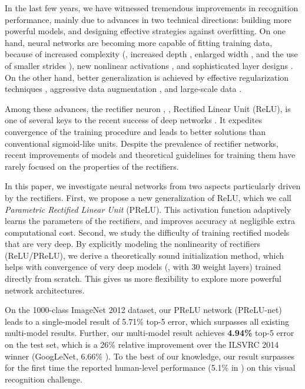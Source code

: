 \documentclass[10pt,twocolumn,letterpaper]{article}
\begin{document}
In the last few years, we have witnessed tremendous improvements in recognition performance, mainly due to advances in two technical directions: building more powerful models, and designing effective strategies against overfitting. On one hand, neural networks are becoming more capable of fitting training data, because of increased complexity (\eg, increased depth \cite{Simonyan2014,Szegedy2014}, enlarged width \cite{Zeiler2014,Sermanet2014}, and the use of smaller strides \cite{Zeiler2014,Sermanet2014,Chatfield2014,Simonyan2014}), new nonlinear activations \cite{Nair2010,Maas2013,Zeiler2013,Lin2013,Srivastava2013,Goodfellow2013}, and sophisticated layer designs \cite{Szegedy2014,He2014}. On the other hand, better generalization is achieved by effective regularization techniques \cite{Hinton2012,Srivastava2014,Goodfellow2013,Wan2013}, aggressive data augmentation \cite{Krizhevsky2012,Howard2013,Simonyan2014,Szegedy2014}, and large-scale data \cite{Deng2009,Russakovsky2014}.

Among these advances, the rectifier neuron \cite{Nair2010,Glorot2011,Maas2013,Zeiler2013}, \eg, Rectified Linear Unit (ReLU), is one of several keys to the recent success of deep networks \cite{Krizhevsky2012}. It expedites convergence of the training procedure \cite{Krizhevsky2012} and leads to better solutions \cite{Nair2010,Glorot2011,Maas2013,Zeiler2013} than conventional sigmoid-like units. Despite the prevalence of rectifier networks, recent improvements of models \cite{Zeiler2014,Sermanet2014,He2014,Simonyan2014,Szegedy2014} and theoretical guidelines for training them \cite{Glorot2010,Saxe2013} have rarely focused on the properties of the rectifiers.

In this paper, we investigate neural networks from two aspects particularly driven by the rectifiers.
First, we propose a new generalization of ReLU, which we call \emph{Parametric Rectified Linear Unit} (PReLU). This activation function adaptively learns the parameters of the rectifiers, and improves accuracy at negligible extra computational cost. Second, we study the difficulty of training rectified models that are very deep. By explicitly modeling the nonlinearity of rectifiers (ReLU/PReLU), we derive a theoretically sound initialization method, which helps with convergence of very deep models (\eg, with 30 weight layers) trained directly from scratch. This gives us more flexibility to explore more powerful network architectures.

On the 1000-class ImageNet 2012 dataset, our PReLU network (PReLU-net) leads to a single-model result of 5.71\% top-5 error, which surpasses all existing multi-model results. Further, our multi-model result achieves \textbf{4.94\%} top-5 error on the test set, which is a 26\% relative improvement over the ILSVRC 2014 winner (GoogLeNet, 6.66\% \cite{Szegedy2014}). To the best of our knowledge, our result surpasses for the first time the reported human-level performance (5.1\% in \cite{Russakovsky2014}) on this visual recognition challenge.
\end{document}
